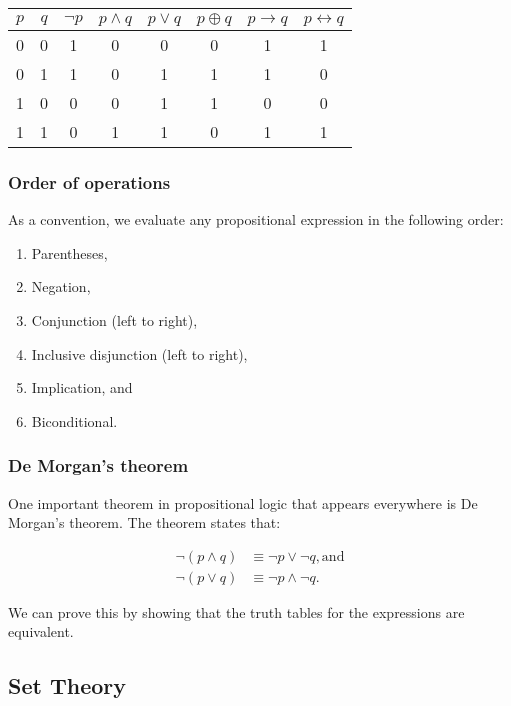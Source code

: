 \begin{longtable}[]{@{}cccccccc@{}}
\toprule
\(p\) & \(q\) & \(\lnot p\) & \(p \land q\) & \(p \lor q\) &
\(p \oplus q\) & \(p \to q\) & \(p \leftrightarrow q\) \\
\midrule
\endhead
0 & 0 & 1 & 0 & 0 & 0 & 1 & 1 \\
0 & 1 & 1 & 0 & 1 & 1 & 1 & 0 \\
1 & 0 & 0 & 0 & 1 & 1 & 0 & 0 \\
1 & 1 & 0 & 1 & 1 & 0 & 1 & 1 \\
\bottomrule
\end{longtable}

\hypertarget{order-of-operations}{%
\subsubsection{Order of operations}\label{order-of-operations}}

As a convention, we evaluate any propositional expression in the
following order:

\begin{enumerate}
\def\labelenumi{\arabic{enumi}.}
\tightlist
\item
  Parentheses,
\item
  Negation,
\item
  Conjunction (left to right),
\item
  Inclusive disjunction (left to right),
\item
  Implication, and
\item
  Biconditional.
\end{enumerate}

\hypertarget{de-morgans-theorem}{%
\subsubsection{De Morgan's theorem}\label{de-morgans-theorem}}

One important theorem in propositional logic that appears everywhere is
De Morgan's theorem. The theorem states that:

\begin{align*}
    \lnot(p \land q) &\equiv \lnot p \lor \lnot q, \text{and}\\
    \lnot(p \lor q) &\equiv \lnot p \land \lnot q.
\end{align*}

We can prove this by showing that the truth tables for the expressions
are equivalent.

\hypertarget{set-theory}{%
\subsection{Set Theory}\label{set-theory}}

